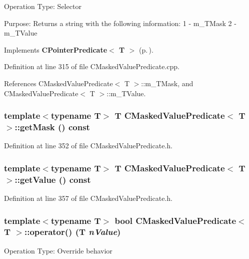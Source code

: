 Operation Type: Selector

Purpose: Returns a string with the following information: 1 - m\_\-TMask 2 - m\_\-TValue 

Implements {\bf CPointer\-Predicate$<$ T $>$} {\rm (p.\,\pageref{classCPointerPredicate_a6})}.

Definition at line 315 of file CMasked\-Value\-Predicate.cpp.

References CMasked\-Value\-Predicate$<$ T $>$::m\_\-TMask, and CMasked\-Value\-Predicate$<$ T $>$::m\_\-TValue.
\subsubsection{\setlength{\rightskip}{0pt plus 5cm}template$<$typename T$>$ T CMasked\-Value\-Predicate$<$ T $>$::get\-Mask () const\hspace{0.3cm}{\tt  [inline]}}\label{classCMaskedValuePredicate_a5}




Definition at line 352 of file CMasked\-Value\-Predicate.h.
\subsubsection{\setlength{\rightskip}{0pt plus 5cm}template$<$typename T$>$ T CMasked\-Value\-Predicate$<$ T $>$::get\-Value () const\hspace{0.3cm}{\tt  [inline]}}\label{classCMaskedValuePredicate_a6}




Definition at line 357 of file CMasked\-Value\-Predicate.h.
\subsubsection{\setlength{\rightskip}{0pt plus 5cm}template$<$typename T$>$ bool CMasked\-Value\-Predicate$<$ T $>$::operator() (T {\em n\-Value})\hspace{0.3cm}{\tt  [virtual]}}\label{classCMaskedValuePredicate_a7}


Operation Type: Override behavior

